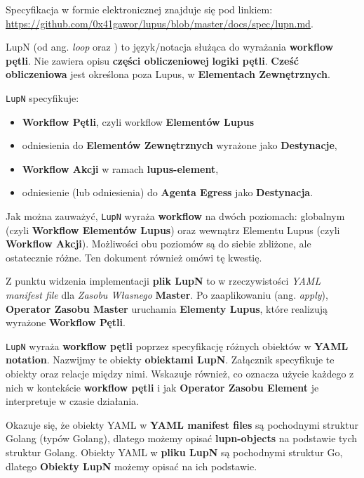 \label{appendix:3}

Specyfikacja w formie elektronicznej znajduje się pod linkiem: \url{https://github.com/0x41gawor/lupus/blob/master/docs/spec/lupn.md}.


LupN (od ang. \textit{loop} oraz ) to język/notacja służąca do wyrażania \textbf{workflow pętli}. Nie zawiera opisu \textbf{części obliczeniowej} \textbf{logiki pętli}. \textbf{Cześć obliczeniowa} jest określona poza Lupus, w \textbf{Elementach Zewnętrznych}.

\texttt{LupN} specyfikuje:
\begin{itemize}
    \item \textbf{Workflow Pętli}, czyli workflow \textbf{Elementów Lupus}
    \item odniesienia do \textbf{Elementów Zewnętrznych} wyrażone jako \textbf{Destynacje},
    \item \textbf{Workflow Akcji}  w ramach \textbf{lupus-element},
    \item odniesienie (lub odniesienia) do \textbf{Agenta Egress} jako \textbf{Destynacja}.
\end{itemize}

Jak można zauważyć, \texttt{LupN} wyraża \textbf{workflow} na dwóch poziomach: globalnym (czyli \textbf{Workflow Elementów Lupus}) oraz wewnątrz Elementu Lupus (czyli \textbf{Workflow Akcji}). Możliwości obu poziomów są do siebie zbliżone, ale ostatecznie różne. Ten dokument również omówi tę kwestię.

Z punktu widzenia implementacji \textbf{plik LupN} to w rzeczywistości \textit{YAML manifest file} dla \textit{Zasobu Własnego} \textbf{Master}. Po zaaplikowaniu (ang. \textit{apply}), \textbf{Operator Zasobu Master} uruchamia \textbf{Elementy Lupus}, które realizują wyrażone \textbf{Workflow Pętli}.

\texttt{LupN} wyraża \textbf{workflow pętli} poprzez specyfikację różnych obiektów w \textbf{YAML notation}. Nazwijmy te obiekty \textbf{obiektami LupN}. Załącznik specyfikuje te obiekty oraz relacje między nimi. Wskazuje również, co oznacza użycie każdego z nich w kontekście \textbf{workflow pętli} i jak \textbf{Operator Zasobu Element} je interpretuje w czasie działania.

Okazuje się, że obiekty YAML w \textbf{YAML manifest files} są pochodnymi struktur Golang (typów Golang), dlatego możemy opisać \textbf{lupn-objects} na podstawie tych struktur Golang.
Obiekty YAML w \textbf{pliku LupN} są pochodnymi struktur Go, dlatego \textbf{Obiekty LupN} możemy opisać na ich podstawie. 

